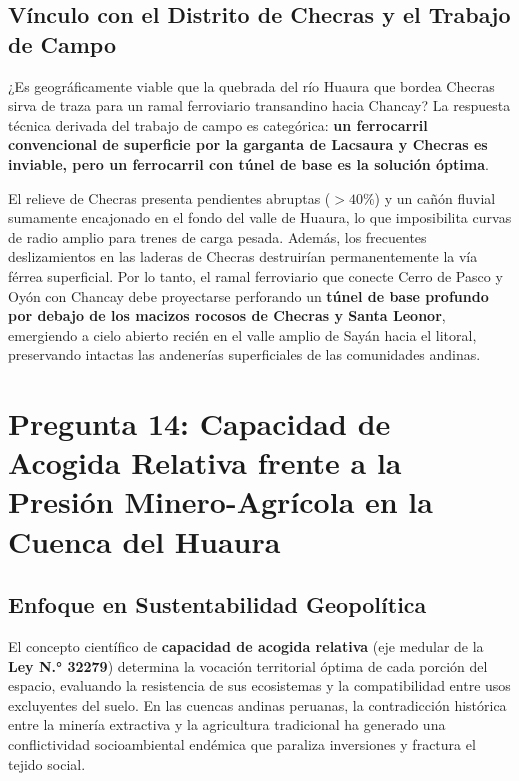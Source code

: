 \documentclass[11pt,a4paper]{article}
\begin{document}
\subsection{Vínculo con el Distrito de Checras y el Trabajo de Campo}
¿Es geográficamente viable que la quebrada del río Huaura que bordea Checras sirva de traza para un ramal ferroviario transandino hacia Chancay? La respuesta técnica derivada del trabajo de campo es categórica: \textbf{un ferrocarril convencional de superficie por la garganta de Lacsaura y Checras es inviable, pero un ferrocarril con túnel de base es la solución óptima}.

El relieve de Checras presenta pendientes abruptas ($> 40\%$) y un cañón fluvial sumamente encajonado en el fondo del valle de Huaura, lo que imposibilita curvas de radio amplio para trenes de carga pesada. Además, los frecuentes deslizamientos en las laderas de Checras destruirían permanentemente la vía férrea superficial. Por lo tanto, el ramal ferroviario que conecte Cerro de Pasco y Oyón con Chancay debe proyectarse perforando un \textbf{túnel de base profundo por debajo de los macizos rocosos de Checras y Santa Leonor}, emergiendo a cielo abierto recién en el valle amplio de Sayán hacia el litoral, preservando intactas las andenerías superficiales de las comunidades andinas.


\newpage

\section{Pregunta 14: Capacidad de Acogida Relativa frente a la Presión Minero-Agrícola en la Cuenca del Huaura}

\subsection{Enfoque en Sustentabilidad Geopolítica}
El concepto científico de \textbf{capacidad de acogida relativa} (eje medular de la \textbf{Ley N.° 32279}) determina la vocación territorial óptima de cada porción del espacio, evaluando la resistencia de sus ecosistemas y la compatibilidad entre usos excluyentes del suelo. En las cuencas andinas peruanas, la contradicción histórica entre la minería extractiva y la agricultura tradicional ha generado una conflictividad socioambiental endémica que paraliza inversiones y fractura el tejido social.
\end{document}
